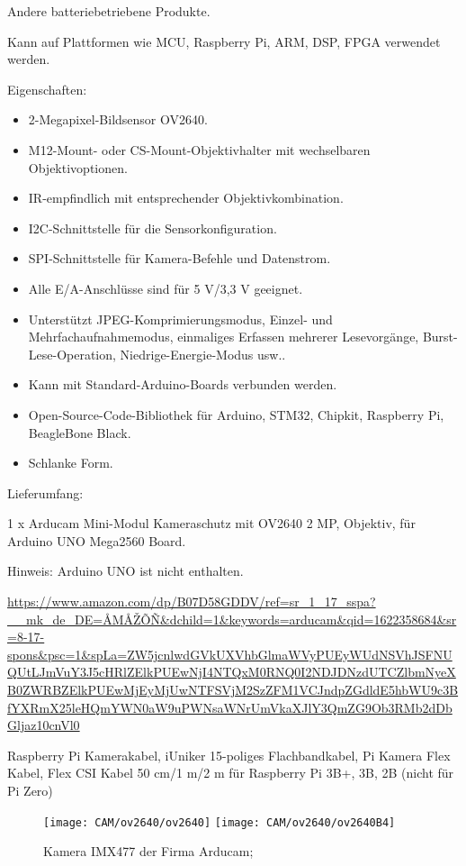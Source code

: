 Andere batteriebetriebene Produkte.

Kann auf Plattformen wie MCU, Raspberry Pi, ARM, DSP, FPGA verwendet werden.

\bigskip

Eigenschaften:

\begin{itemize}
  \item 2-Megapixel-Bildsensor OV2640.
  \item M12-Mount- oder CS-Mount-Objektivhalter mit wechselbaren Objektivoptionen.
  \item IR-empfindlich mit entsprechender Objektivkombination.
  \item I2C-Schnittstelle für die Sensorkonfiguration.
  \item SPI-Schnittstelle für Kamera-Befehle und Datenstrom.
  \item Alle E/A-Anschlüsse sind für 5 V/3,3 V geeignet.
  \item Unterstützt JPEG-Komprimierungsmodus, Einzel- und Mehrfachaufnahmemodus, einmaliges Erfassen mehrerer Lesevorgänge, Burst-Lese-Operation, Niedrige-Energie-Modus usw..
  \item Kann mit Standard-Arduino-Boards verbunden werden.
  \item Open-Source-Code-Bibliothek für Arduino, STM32, Chipkit, Raspberry Pi, BeagleBone Black.
  \item Schlanke Form.
\end{itemize}

\bigskip

Lieferumfang:

1 x Arducam Mini-Modul Kameraschutz mit OV2640 2 MP, Objektiv, für Arduino UNO Mega2560 Board.

Hinweis: Arduino UNO ist nicht enthalten.

\bigskip


\url{https://www.amazon.com/dp/B07D58GDDV/ref=sr_1_17_sspa?__mk_de_DE=ÅMÅŽÕÑ&dchild=1&keywords=arducam&qid=1622358684&sr=8-17-spons&psc=1&spLa=ZW5jcnlwdGVkUXVhbGlmaWVyPUEyWUdNSVhJSFNUQUtLJmVuY3J5cHRlZElkPUEwNjI4NTQxM0RNQ0I2NDJDNzdUTCZlbmNyeXB0ZWRBZElkPUEwMjEyMjUwNTFSVjM2SzZFM1VCJndpZGdldE5hbWU9c3BfYXRmX25leHQmYWN0aW9uPWNsaWNrUmVkaXJlY3QmZG9Ob3RMb2dDbGljaz10cnVl0}

    
Raspberry Pi Kamerakabel, iUniker 15-poliges Flachbandkabel, Pi Kamera Flex Kabel, Flex CSI Kabel 50 cm/1 m/2 m für Raspberry Pi 3B+, 3B, 2B (nicht für Pi Zero)
    
\begin{figure}
    \begin{center}
        \texttt{[image: CAM/ov2640/ov2640]}
        \quad 
        \texttt{[image: CAM/ov2640/ov2640B4]}
        
        \caption{Kamera IMX477 der Firma Arducam; \cite{Arducam:2021}}
    \end{center}    
\end{figure}



